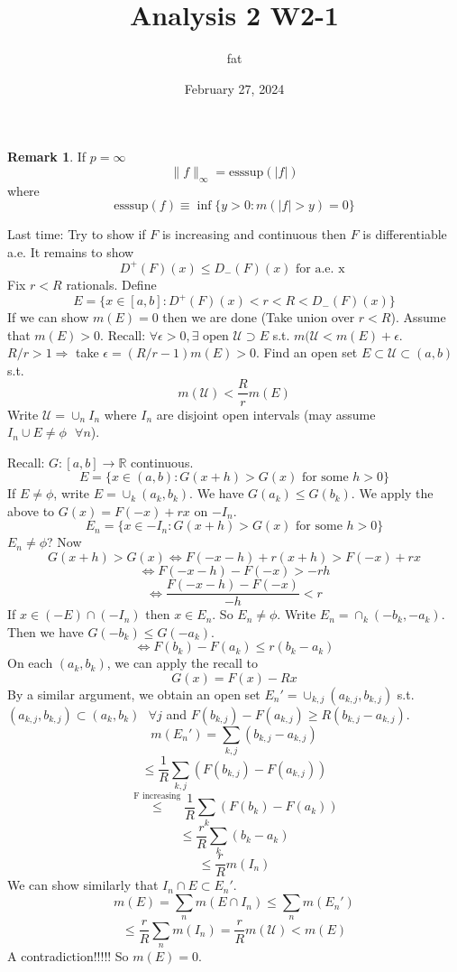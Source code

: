 \documentclass{article}
\title{Analysis 2 W2-1}
\author{fat}
\date{February 27, 2024}
\newcommand{\sfa}{\text{  } \forall}
\theoremstyle{definition}
\theoremstyle{definition}
\newtheorem{rem}{Remark}
\begin{document}
\maketitle
\thispagestyle{fancy}
\renewcommand{\footrulewidth}{0.4pt}
\cfoot{\thepage}
\renewcommand{\headrulewidth}{0.4pt}

\begin{rem}
  If $p = \infty$
  \[
    \|f\|_{\infty} = \text{esssup} (|f|)
  \]
  where
  \[
    \text{esssup} (f) \equiv \inf \{y > 0: m(|f| > y) = 0\}
  \]
\end{rem}

Last time: Try to show if $F$ is increasing and continuous then $F$ is differentiable a.e. It remains to show 
\[
  D^+(F)(x) \leq D_-(F)(x) \text{ for a.e. x }
\]
Fix $r < R$ rationals. Define 
\[
  E = \{x \in [a, b]: D^+(F)(x) < r < R < D_-(F)(x)\}
\]
If we can show $m(E) = 0$ then we are done (Take union over $r < R$). Assume that $m(E) > 0$. Recall: $\forall \epsilon > 0, \exists \text{ open } \mathcal{U} \supset E$ s.t. $m(\mathcal{U} < m(E) + \epsilon$. $R/r > 1 \Rightarrow$ take $\epsilon = (R/r - 1) m(E) > 0$. Find an open set $E \subset \mathcal{U} \subset (a, b)$ s.t. 
\[
  m(\mathcal{U}) < \frac{R}{r} m(E)
\]
Write $\mathcal{U} = \cup_{n} I_n$ where $I_n$ are disjoint open intervals (may assume $I_n \cup E \neq \phi \sfa n$). 
\par Recall: $G:[a, b] \to \mathbb{R}$ continuous. 
\[
E = \{x \in (a, b) : G(x + h) > G(x) \text{ for some } h > 0\}
\]
If $E \neq \phi$, write $E = \cup_k(a_k, b_k)$. We have $G(a_k) \leq G(b_k)$. We apply the above to $G(x) = F(-x) + rx$ on $-I_n$. 
\[
  E_n = \{x \in -I_n: G(x + h) > G(x) \text{ for some }h > 0\}
\]
$E_n \neq \phi$? Now 
\[
  G(x + h) > G(x) \Leftrightarrow F(-x - h)+ r(x + h) > F(-x) + rx
\]
\[
  \Leftrightarrow F(-x - h) - F(-x) > -rh
\]
\[
  \Leftrightarrow \frac{F(-x - h) - F(-x)}{-h} < r
\]
If $x \in (-E) \cap (-I_n)$ then $x \in E_n$. So $E_n \neq \phi$. Write $E_n = \cap_k (-b_k, -a_k)$. Then we have $G(-b_k) \leq G(-a_k)$. 
\[
  \Leftrightarrow F(b_k) - F(a_k) \leq r (b_k - a_k)
\]
On each $(a_k, b_k)$, we can apply the recall to 
\[
  G(x) = F(x) - Rx
\]
By a similar argument, we obtain an open set $E_n' = \cup_{k, j} (a_{k, j}, b_{k, j})$ s.t. $(a_{k, j}, b_{k, j}) \subset (a_k, b_k) \sfa j$ and $F(b_{k, j}) - F(a_{k, j}) \geq R(b_{k, j} - a_{k, j})$. 
\[
  m(E_n') = \sum_{k, j} ( b_{k, j} - a_{k, j})
\]
\[
  \leq \frac{1}{R} \sum_{k, j} (F(b_{k, j}) - F(a_{k, j}))
\]
\[
  \stackrel{\text{F increasing}}{\leq} \frac{1}{R} \sum_{k} (F(b_k) - F(a_k))
\]
\[
  \leq \frac{r}{R} \sum_k (b_k - a_k)
\]
\[
  \leq \frac{r}{R} m(I_n)
\]
We can show similarly that $I_n \cap E \subset E_n'$. 
\[
  m(E) = \sum_n m(E \cap I_n) \leq \sum_n m(E_n')
\]
\[
  \leq \frac{r}{R} \sum_n m(I_n) = \frac{r}{R} m(\mathcal{U}) < m(E)
\]
A contradiction!!!!! So $m(E) = 0$. 
\end{document}
